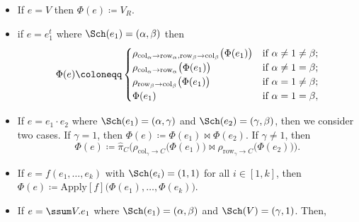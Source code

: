 \begin{itemize}
	\item If $e=V$ then $\Phi(e)\coloneqq V_R$.
	\item if $e=e_1^t$ where $\Sch(e_1)=(\alpha,\beta)$ then \[
\Phi(e) \coloneqq 
\begin{cases}
\rho_{\mathrm{col}_\alpha \to \mathrm{row}_\alpha,\mathrm{row}_\beta \to \mathrm{col}_\beta}\bigl(\Phi(e_1)\bigr) & \text{if } \alpha \neq 1 \neq \beta; \cr
\rho_{\mathrm{col}_\alpha \to \mathrm{row}_\alpha}\bigl(\Phi(e_1)\bigr) & \text{if } \alpha \neq 1 = \beta; \cr
\rho_{\mathrm{row}_\beta \to \mathrm{col}_\beta}\bigl(\Phi(e_1)\bigr) & \text{if } \alpha = 1 \neq \beta; \cr
\Phi(e_1) & \text{if } \alpha = 1 = \beta,
\end{cases}
\]
\item
	If $e = e_1 \cdot e_2$ where $\Sch(e_1) = (\alpha,\gamma)$ and $\Sch(e_2) =(\gamma,\beta)$, then we consider two cases. If $\gamma = 1$, then $\Phi(e) \coloneqq  \Phi(e_1) \Join \Phi(e_2)$. If $\gamma \neq 1$, then 
	$$
	\Phi(e) \coloneqq  \hat{\pi}_C\Bigr(\rho_{\mathrm{col}_\gamma\to C}\bigl(\Phi(e_1)\bigr)\Join\rho_{\mathrm{row}_\gamma\to C}\bigl(\Phi(e_2)\bigr)\Bigr).$$
	\item If $e=f(e_1,\ldots,e_k)$ with $\Sch(e_i)=(1,1)$ for all $i\in[1,k]$, then
	$\Phi(e)\coloneqq \text{Apply}[f]\bigl(\Phi(e_1),\ldots,\Phi(e_k)\bigr)$. 
	\item If $e=\ssum V.e_1$ where $\Sch(e_1)=(\alpha,\beta)$ and $\Sch(V)=(\gamma,1)$. Then,

\end{itemize}
